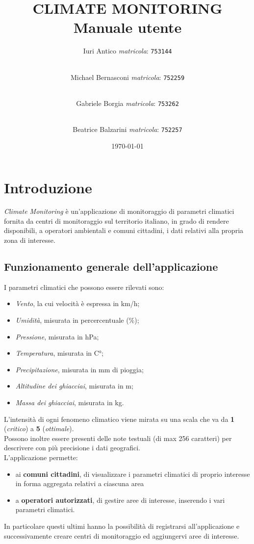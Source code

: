 \documentclass[a4paper,12pt]{article}
\title {
	CLIMATE MONITORING \\
	{Manuale utente}}
\author{
	Iuri Antico \textit{matricola}:
	\texttt{753144}
	\and \\
	Michael Bernasconi \textit{matricola}:
	\texttt{752259}
	\and \\
	Gabriele Borgia \textit{matricola}:
	\texttt{753262}
	\and \\
	Beatrice Balzarini \textit{matricola}:
	\texttt{752257}
}
\date{\today}
\begin{document}
	
	\makeatletter
	\begin{titlepage}
		\maketitle
	\end{titlepage}
	\makeatother

	\tableofcontents

	\newpage
	
	\section{Introduzione}
	\textit{Climate Monitoring} è un'applicazione di monitoraggio di parametri climatici fornita da centri di monitoraggio sul territorio italiano, in grado di rendere disponibili, a operatori ambientali e comuni cittadini, i dati relativi alla propria zona di interesse.
	
		\subsection{Funzionamento generale dell'applicazione}
		I parametri climatici che possono essere rilevati sono:
		\begin{itemize}
		\item \textit{Vento}, la cui velocità è espressa in km/h;
		\item \textit{Umidità}, misurata in percercentuale (\%);
		\item \textit{Pressione}, misurata in hPa;
		\item \textit{Temperatura}, misurata in C°;
		\item \textit{Precipitazione}, misurata in mm di pioggia;
		\item \textit{Altitudine dei ghiacciai}, misurata in m;
		\item \textit{Massa dei ghiacciai}, misurata in kg.
		\end{itemize}
		L'intensità di ogni fenomeno climatico viene mirata su una scala che va da \textbf{1} (\textit{critico}) a \textbf{5} (\textit{ottimale}).
		\\
		Possono inoltre essere presenti delle note testuali (di max 256 caratteri) per descrivere con più precisione i dati geografici.
		\\
		L'applicazione permette:
		\begin{itemize}
		\item ai \textbf{comuni cittadini}, di visualizzare i parametri climatici di proprio interesse in forma aggregata relativi a ciascuna area
		\item a \textbf{operatori autorizzati}, di gestire aree di interesse, inserendo i vari parametri climatici.
		\end{itemize}
		In particolare questi ultimi hanno la possibilità di registrarsi all'applicazione e successivamente creare centri di monitoraggio ed aggiungervi aree di interesse.
	
\end{document}
